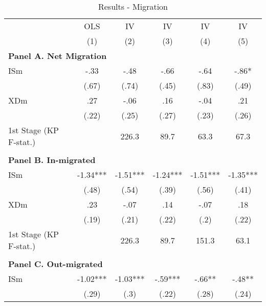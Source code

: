 \noindent \begin{center}
\begin{table}[h!]
\begin{center}
\protect\caption{\label{tab:Table_migrated}Results - Migration}
\begin{centering}
\begin{tabular}{lccccc}
\hline 
 & {\footnotesize{}OLS } & {\footnotesize{}IV } & {\footnotesize{}IV } & {\footnotesize{}IV } & {\footnotesize{}IV }\tabularnewline
 & {\scriptsize{}(1)} & {\scriptsize{}(2)} & {\scriptsize{}(3)} & {\scriptsize{}(4)} & {\scriptsize{}(5)}\tabularnewline
\hline 
\multicolumn{6}{l}{\textbf{\footnotesize{}Panel A. Net Migration}}\tabularnewline
{\footnotesize{}ISm} & {\footnotesize{} -.33} & {\footnotesize{} -.48} & {\footnotesize{} -.66} & {\footnotesize{} -.64} & {\footnotesize{} -.86*}\tabularnewline
 & {\scriptsize{}(.67)} & {\scriptsize{}(.74)} & {\scriptsize{}(.45)} & {\scriptsize{}(.83)} & {\scriptsize{}(.49)}\tabularnewline
{\footnotesize{}XDm} & {\footnotesize{} .27} & {\footnotesize{} -.06} & {\footnotesize{} .16} & {\footnotesize{} -.04} & {\footnotesize{} .21}\tabularnewline
 & {\scriptsize{}(.22)} & {\scriptsize{}(.25)} & {\scriptsize{}(.27)} & {\scriptsize{}(.23)} & {\scriptsize{}(.26)}\tabularnewline
{\scriptsize{}1st Stage (KP F-stat.)} &  & {\scriptsize{} 226.3} & {\scriptsize{} 89.7} & {\scriptsize{} 63.3} & {\scriptsize{} 67.3}\tabularnewline
 &  &  &  &  & \tabularnewline
\multicolumn{6}{l}{\textbf{\footnotesize{}Panel B. In-migrated}}\tabularnewline
{\footnotesize{}ISm} & {\footnotesize{} -1.34***} & {\footnotesize{} -1.51***} & {\footnotesize{} -1.24***} & {\footnotesize{} -1.51***} & {\footnotesize{} -1.35***}\tabularnewline
 & {\scriptsize{}(.48)} & {\scriptsize{}(.54)} & {\scriptsize{}(.39)} & {\scriptsize{}(.56)} & {\scriptsize{}(.41)}\tabularnewline
{\footnotesize{}XDm} & {\footnotesize{} .23} & {\footnotesize{} -.07} & {\footnotesize{} .14} & {\footnotesize{} -.07} & {\footnotesize{} .18}\tabularnewline
 & {\scriptsize{}(.19)} & {\scriptsize{}(.21)} & {\scriptsize{}(.22)} & {\scriptsize{}(.2)} & {\scriptsize{}(.22)}\tabularnewline
{\scriptsize{}1st Stage (KP F-stat.)} &  & {\scriptsize{} 226.3} & {\scriptsize{} 89.7} & {\scriptsize{} 151.3} & {\scriptsize{} 63.1}\tabularnewline
 &  &  &  &  & \tabularnewline
\multicolumn{6}{l}{\textbf{\footnotesize{}Panel C. Out-migrated}}\tabularnewline
{\footnotesize{}ISm} & {\footnotesize{} -1.02***} & {\footnotesize{} -1.03***} & {\footnotesize{} -.59***} & {\footnotesize{} -.66**} & {\footnotesize{} -.48**}\tabularnewline
 & {\scriptsize{}(.29)} & {\scriptsize{}(.3)} & {\scriptsize{}(.22)} & {\scriptsize{}(.28)} & {\scriptsize{}(.24)}\tabularnewline

\end{tabular}
\end{centering}
\end{center}
\end{table}
\end{center}
